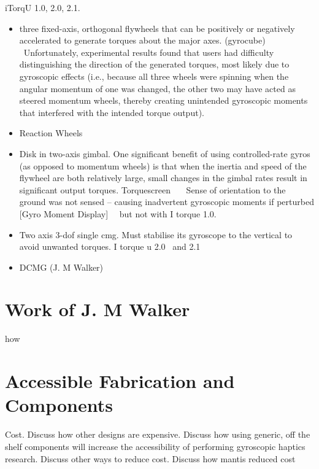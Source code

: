 \documentclass[a4paper]{article}
\newcommand\liststyleWWNumxxvii{%
\renewcommand\labelitemi{[F0B7?]}
\renewcommand\labelitemii{o}
\renewcommand\labelitemiii{[F0A7?]}
\renewcommand\labelitemiv{[F0B7?]}
}
\begin{document}
iTorqU 1.0, 2.0, 2.1. \ 

\liststyleWWNumxxvii
\begin{itemize}
\item three fixed-axis, orthogonal flywheels that can be positively or negatively accelerated to generate torques about
the major axes. (gyrocube) \cite{CITATIONYTa01l2057}\ \textcolor[rgb]{0.2,0.2,0.2}{Unfortunately, experimental results
found that users had difficulty distinguishing the direction of the generated torques, most likely due to gyroscopic
effects (i.e., because all three wheels were spinning when the angular momentum of one was changed, the other two may
have acted as steered momentum wheels, thereby creating unintended gyroscopic moments that interfered with the intended
torque output).}
\item \textcolor[rgb]{0.2,0.2,0.2}{Reaction Wheels}
\item \textcolor[rgb]{0.2,0.2,0.2}{Disk in two-axis gimbal. One significant benefit of using controlled-rate gyros (as
opposed to momentum wheels) is that when the inertia and speed of the flywheel are both relatively large, small changes
in the gimbal rates result in significant output torques. Torquescreen
}\cite{CITATIONMMu15l2057}\textcolor[rgb]{0.2,0.2,0.2}{\ \ \ Sense of orientation to the ground was not sensed --
causing inadvertent gyroscopic moments if perturbed [Gyro Moment Display]
\ }\cite{CITATIONHYa03l2057}\textcolor[rgb]{0.2,0.2,0.2}{\ but not with I torque 1.0.}
\item Two axis 3-dof single cmg. Must stabilise its gyroscope to the vertical to avoid unwanted torques. I torque u 2.0
\cite{CITATIONKNW09l2057}\ and 2.1 \cite{CITATIONKNW10l2057}
\item DCMG (J. M Walker) \cite{CITATIONJMW16l2057}\ \cite{CITATIONJMW18l2057}
\end{itemize}
\section[Work of J. M Walker]{\textbf{Work of J. M Walker}}

\bigskip

how


\bigskip

\section[Accessible Fabrication and Components]{\textbf{Accessible Fabrication and Components}}
Cost. Discuss how other designs are expensive. Discuss how using generic, off the shelf components will increase the
accessibility of performing gyroscopic haptics research. Discuss other ways to reduce cost. Discuss how mantis reduced
cost
\end{document}

